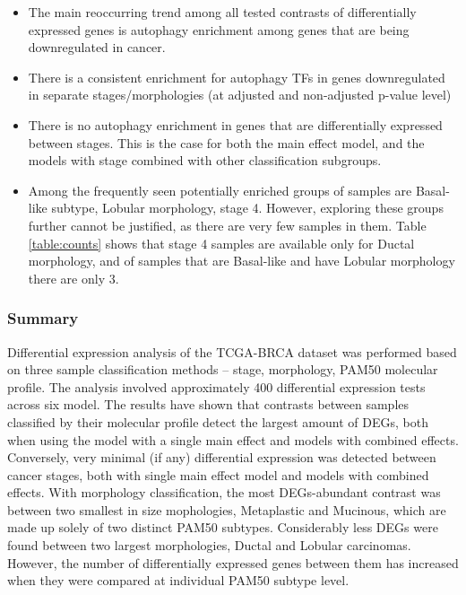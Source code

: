         \begin{itemize}
            
        \item The main reoccurring trend among all tested contrasts of differentially expressed genes is autophagy enrichment among genes that are being downregulated in cancer. 
        \item There is a consistent enrichment for autophagy TFs in genes downregulated in separate stages/morphologies (at adjusted and non-adjusted p-value level)
       \item There is no autophagy enrichment in genes that are differentially expressed between stages. This is the case for both the main effect model, and the models with stage combined with other classification subgroups.

       \item Among the frequently seen potentially enriched groups of samples are Basal-like subtype, Lobular morphology, stage 4.  However, exploring these groups further cannot be justified, as there are very few samples in them. Table \ref{table:counts} shows that stage 4 samples are available only for Ductal morphology, and of samples that are Basal-like and have Lobular morphology there are only 3. 

        
        \end{itemize}
        \subsubsection{Summary}
        
        Differential expression analysis of the TCGA-BRCA dataset was performed based on three sample classification methods -- stage, morphology, PAM50 molecular profile. The analysis involved approximately 400 differential expression tests across six model. The results have shown that contrasts between samples classified by their molecular profile detect the largest amount of DEGs, both when using the model with a single main effect and models with combined effects. Conversely, very minimal (if any) differential expression was detected between cancer stages, both with single main effect model and models with combined effects. With morphology classification, the most DEGs-abundant contrast was between two smallest in size mophologies, Metaplastic and Mucinous, which are made up solely of two distinct PAM50 subtypes. Considerably less DEGs were found between two largest morphologies, Ductal and Lobular carcinomas. However, the number of differentially expressed genes between them has increased when they were compared at individual PAM50 subtype level. 
        
